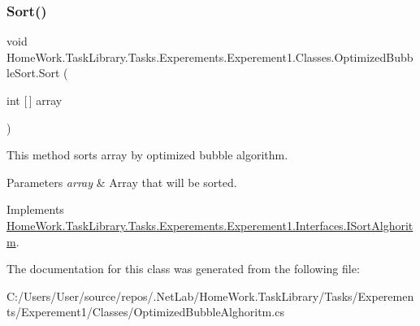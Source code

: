 \subsubsection{\texorpdfstring{Sort()}{Sort()}}
{\footnotesize\ttfamily void Home\+Work.\+Task\+Library.\+Tasks.\+Experements.\+Experement1.\+Classes.\+Optimized\+Bubble\+Sort.\+Sort (\begin{DoxyParamCaption}\item[{int \mbox{[}$\,$\mbox{]}}]{array }\end{DoxyParamCaption})}



This method sorts array by optimized bubble algorithm. 


\begin{DoxyParams}{Parameters}
{\em array} & Array that will be sorted.\\
\hline
\end{DoxyParams}


Implements \mbox{\hyperlink{interface_home_work_1_1_task_library_1_1_tasks_1_1_experements_1_1_experement1_1_1_interfaces_1_1_i_sort_alghoritm}{Home\+Work.\+Task\+Library.\+Tasks.\+Experements.\+Experement1.\+Interfaces.\+I\+Sort\+Alghoritm}}.



The documentation for this class was generated from the following file\+:\begin{DoxyCompactItemize}
\item 
C\+:/\+Users/\+User/source/repos/.\+Net\+Lab/\+Home\+Work.\+Task\+Library/\+Tasks/\+Experements/\+Experement1/\+Classes/Optimized\+Bubble\+Alghoritm.\+cs\end{DoxyCompactItemize}
